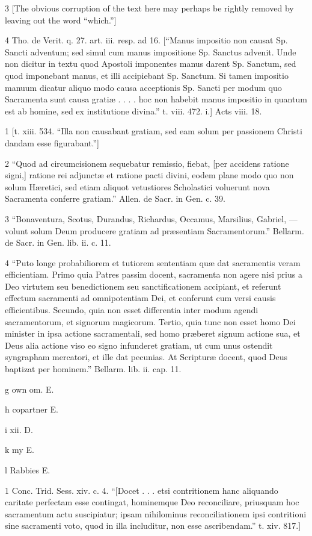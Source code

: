 3
[The obvious corruption of the text here may perhaps be rightly removed by leaving out the word “which.”]

4
Tho. de Verit. q. 27. art. iii. resp. ad 16. [“Manus impositio non causat Sp. Sancti adventum; sed simul cum manus impositione Sp. Sanctus advenit. Unde non dicitur in textu quod Apostoli imponentes manus darent Sp. Sanctum, sed quod imponebant manus, et illi accipiebant Sp. Sanctum. Si tamen impositio manuum dicatur aliquo modo causa acceptionis Sp. Sancti per modum quo Sacramenta sunt causa gratiæ . . . . hoc non habebit manus impositio in quantum est ab homine, sed ex institutione divina.” t. viii. 472. i.] Acts viii. 18.

1
[t. xiii. 534. “Illa non causabant gratiam, sed eam solum per passionem Christi dandam esse figurabant.”]

2
“Quod ad circumcisionem sequebatur remissio, fiebat, [per accidens ratione signi,] ratione rei adjunctæ et ratione pacti divini, eodem plane modo quo non solum Hæretici, sed etiam aliquot vetustiores Scholastici voluerunt nova Sacramenta conferre gratiam.” Allen. de Sacr. in Gen. c. 39.

3
“Bonaventura, Scotus, Durandus, Richardus, Occamus, Marsilius, Gabriel, — volunt solum Deum producere gratiam ad præsentiam Sacramentorum.” Bellarm. de Sacr. in Gen. lib. ii. c. 11.

4
“Puto longe probabiliorem et tutiorem sententiam quæ dat sacramentis veram efficientiam. Primo quia Patres passim docent, sacramenta non agere nisi prius a Deo virtutem seu benedictionem seu sanctificationem accipiant, et referunt effectum sacramenti ad omnipotentiam Dei, et conferunt cum versi causis efficientibus. Secundo, quia non esset differentia inter modum agendi sacramentorum, et signorum magicorum. Tertio, quia tunc non esset homo Dei minister in ipsa actione sacramentali, sed homo præberet signum actione sua, et Deus alia actione viso eo signo infunderet gratiam, ut cum unus ostendit syngrapham mercatori, et ille dat pecunias. At Scripturæ docent, quod Deus baptizat per hominem.” Bellarm. lib. ii. cap. 11.

g
own om. E.

h
copartner E.

i
xii. D.

k
my E.

l
Rabbies E.

1
Conc. Trid. Sess. xiv. c. 4. “[Docet . . . etsi contritionem hanc aliquando caritate perfectam esse contingat, hominemque Deo reconciliare, priusquam hoc sacramentum actu suscipiatur; ipsam nihilominus reconciliationem ipsi contritioni sine sacramenti voto, quod in illa includitur, non esse ascribendam.” t. xiv. 817.]

